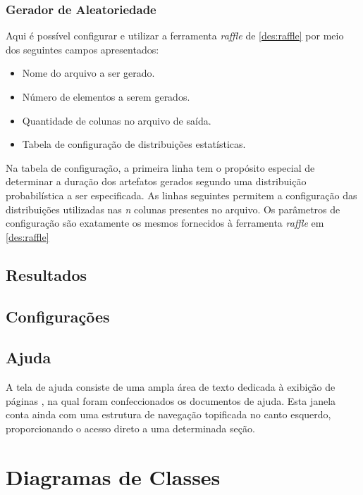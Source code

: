 \subsubsection{Gerador de Aleatoriedade}

Aqui é possível configurar e utilizar a ferramenta \emph{raffle} de \ref{des:raffle} por meio dos seguintes campos apresentados:

\begin{itemize}
	\item Nome do arquivo a ser gerado.
	\item Número de elementos a serem gerados.
	\item Quantidade de colunas no arquivo de saída.
	\item Tabela de configuração de distribuições estatísticas.
\end{itemize}

Na tabela de configuração, a primeira linha tem o propósito especial de determinar a duração dos artefatos gerados segundo uma distribuição probabilística a ser especificada.
As linhas seguintes permitem a configuração das distribuições utilizadas nas \emph{n} colunas presentes no arquivo.
Os parâmetros de configuração são exatamente os mesmos fornecidos à ferramenta \emph{raffle} em \ref{des:raffle}

\subsection{Resultados}
\label{des:resultados}

\subsection{Configurações}



\subsection{Ajuda}

A tela de ajuda consiste de uma ampla área de texto dedicada à exibição de páginas , na qual foram confeccionados os documentos de ajuda.
Esta janela conta ainda com uma estrutura de navegação topificada no canto esquerdo, proporcionando o acesso direto a uma determinada seção.

\section{Diagramas de Classes}

